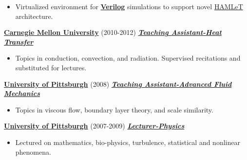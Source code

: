 \documentclass{article}
\newcommand{\employer}[3]{{ \textbf{#1} (#2) \underline{\textbf{\emph{#3}}}\\  }}
\newenvironment{achievements}{\begin{list}{$\bullet$}{\topsep 0pt \itemsep -2pt}}{\vspace*{4pt}\end{list}}
\begin{document}
\begin{itemize}
  \begin{itemize}
    \item Virtualized environment for \textbf{\href{https://en.wikipedia.org/wiki/Verilog}{Verilog}} simulations to support novel \href{http://www.contrib.andrew.cmu.edu/~bakin/publ.html}{HAMLeT} architecture.
  \end{itemize}


\end{itemize}


\employer{\href{https://www.cmu.edu/me/}{Carnegie Mellon University}}{2010-2012}{Teaching Assistant-Heat Transfer}
  \begin{itemize}
    \item Topics in conduction, convection, and radiation. Supervised recitations and substituted for lectures. 
  \end{itemize}

\employer{\href{http://www.engineering.pitt.edu/MEMS/}{University of Pittsburgh}}{2008}{Teaching Assistant-Advanced Fluid Mechanics}
  \begin{itemize}
    \item Topics in viscous flow, boundary layer theory, and scale similarity. 
  \end{itemize}

\employer{\href{http://www.physicsandastronomy.pitt.edu/}{University of Pittsburgh}}{2007-2009}{Lecturer-Physics}
  \begin{itemize}
    \item Lectured on mathematics, bio-physics, turbulence, statistical and nonlinear phenomena. 
  \end{itemize}
\end{document}
